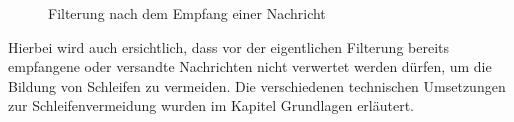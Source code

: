 \begin{figure}[H]
	\centering
	\hspace*{1cm}
	\caption{Filterung nach dem Empfang einer Nachricht}
	\label{fig:empfangNachricht}
\end{figure}
Hierbei wird auch ersichtlich, dass vor der eigentlichen Filterung bereits empfangene oder versandte Nachrichten nicht verwertet werden dürfen, um die Bildung von Schleifen zu vermeiden. Die verschiedenen technischen Umsetzungen zur Schleifenvermeidung wurden im Kapitel Grundlagen erläutert. 
